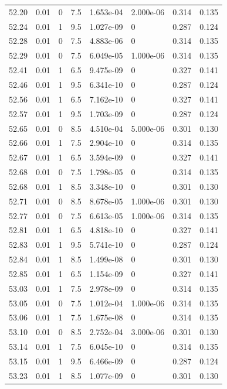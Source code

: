 \documentclass[preview]{standalone}
\begin{document}
{{{{{{{{{{{{{{{\begin{tabular}{L{1.2cm}C{1.2cm} C{0.3cm}C{0.5cm} C{1.4cm}C{1.4cm} C{1.4cm}C{1.4cm}}
  52.20  &  0.01  & 0     & 7.5 &  1.653e-04  & 2.000e-06  & 0.314 &  0.135   \\ 
  52.24  &  0.01  & 1     & 9.5 &  1.027e-09  & 0  & 0.287 &  0.124   \\ 
  52.28  &  0.01  & 0     & 7.5 &  4.883e-06  & 0  & 0.314 &  0.135   \\ 
  52.29  &  0.01  & 0     & 7.5 &  6.049e-05  & 1.000e-06  & 0.314 &  0.135   \\ 
  52.41  &  0.01  & 1     & 6.5 &  9.475e-09  & 0  & 0.327 &  0.141   \\ 
  52.46  &  0.01  & 1     & 9.5 &  6.341e-10  & 0  & 0.287 &  0.124   \\ 
  52.56  &  0.01  & 1     & 6.5 &  7.162e-10  & 0  & 0.327 &  0.141   \\ 
  52.57  &  0.01  & 1     & 9.5 &  1.703e-09  & 0  & 0.287 &  0.124   \\ 
  52.65  &  0.01  & 0     & 8.5 &  4.510e-04  & 5.000e-06  & 0.301 &  0.130   \\ 
  52.66  &  0.01  & 1     & 7.5 &  2.904e-10  & 0  & 0.314 &  0.135   \\ 
  52.67  &  0.01  & 1     & 6.5 &  3.594e-09  & 0  & 0.327 &  0.141   \\ 
  52.68  &  0.01  & 0     & 7.5 &  1.798e-05  & 0  & 0.314 &  0.135   \\ 
  52.68  &  0.01  & 1     & 8.5 &  3.348e-10  & 0  & 0.301 &  0.130   \\ 
  52.71  &  0.01  & 0     & 8.5 &  8.678e-05  & 1.000e-06  & 0.301 &  0.130   \\ 
  52.77  &  0.01  & 0     & 7.5 &  6.613e-05  & 1.000e-06  & 0.314 &  0.135   \\ 
  52.81  &  0.01  & 1     & 6.5 &  4.818e-10  & 0  & 0.327 &  0.141   \\ 
  52.83  &  0.01  & 1     & 9.5 &  5.741e-10  & 0  & 0.287 &  0.124   \\ 
  52.84  &  0.01  & 1     & 8.5 &  1.499e-08  & 0  & 0.301 &  0.130   \\ 
  52.85  &  0.01  & 1     & 6.5 &  1.154e-09  & 0  & 0.327 &  0.141   \\ 
  53.03  &  0.01  & 1     & 7.5 &  2.978e-09  & 0  & 0.314 &  0.135   \\ 
  53.05  &  0.01  & 0     & 7.5 &  1.012e-04  & 1.000e-06  & 0.314 &  0.135   \\ 
  53.06  &  0.01  & 1     & 7.5 &  1.675e-08  & 0  & 0.314 &  0.135   \\ 
  53.10  &  0.01  & 0     & 8.5 &  2.752e-04  & 3.000e-06  & 0.301 &  0.130   \\ 
  53.14  &  0.01  & 1     & 7.5 &  6.045e-10  & 0  & 0.314 &  0.135   \\ 
  53.15  &  0.01  & 1     & 9.5 &  6.466e-09  & 0  & 0.287 &  0.124   \\ 
  53.23  &  0.01  & 1     & 8.5 &  1.077e-09  & 0  & 0.301 &  0.130   \\ 
\hline 
\end{tabular} 

}}}}}}}}}}}}}}}
\end{document}
